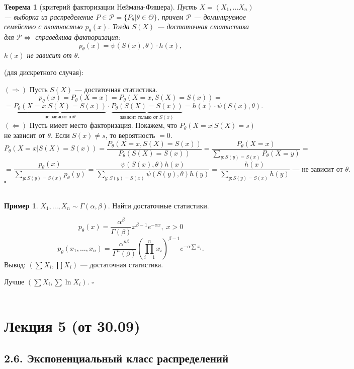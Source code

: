 \documentclass[12pt]{report}
\renewenvironment{proof}{{\bfseries Доказательство:}}{$\square$\\\\}
\newenvironment{solution}{{\bfseries Решение:}}{$\square$\\\\}
\newtheorem{theorem}{Теорема}
\theoremstyle{definition}
\newtheorem{example}{Пример}
\begin{document}
\begin{theorem}[критерий факторизации Неймана-Фишера]
	Пусть $X = (X_1, \ldots X_n)$ — выборка из распределение $P \in \mathcal{P} = \{P_\theta | \theta \in \Theta\}$, причем $\mathcal{P}$ — доминируемое семейство с плотностью $p_\theta(x)$. Тогда $S(X)$ — достаточная статистика для $\mathcal{P} \Leftrightarrow$ справедлива факторизация:
	$$p_\theta(x) = \psi(S(x), \theta) \cdot h(x),$$
	$h(x)$ не зависит от $\theta$.
\end{theorem}
\begin{proof}
	(для дискретного случая):

	$(\Rightarrow)$ Пусть $S(X)$ — достаточная статистика.
	$$p_\theta(x) = P_\theta(X = x) = P_\theta(X = x, S(X) = S(x)) = $$ 
	$$ = \underbrace{P_\theta(X = x | S(X) = S(x))}_{\text{не зависит от} \theta} \cdot \underbrace{P_\theta(S(X) = S(x))}_{\text{зависит только от }S(x)} = h(x) \cdot \psi(S(x), \theta).$$
	$(\Leftarrow)$ Пусть имеет место факторизация. Покажем, что $P_\theta(X = x | S(X) = s)$ не зависит от $\theta$. Если $S(x) \neq s$, то вероятность $ = 0$.
	$$P_\theta(X = x | S(X) = S(x)) = \dfrac{P_\theta(X = x, S(X) = S(x))}{P_\theta(S(X) = S(x))} = \dfrac{P_\theta(X = x)}{\displaystyle{\sum_{y: S(y) = S(x)}} P_\theta (X = y)} = $$ 
	$$ = \dfrac{p_\theta(x)}{\displaystyle{\sum_{y: S(y) = S(x)}} p_\theta(y)} = \dfrac{\psi(S(x), \theta)h(x)}{\displaystyle{\sum_{y: S(y) = S(x)}} \psi(S(y), \theta)h(y)} = \dfrac{h(x)}{\displaystyle{\sum_{y: S(y) = S(x)} h(y)}} \text{ — не зависит от } \theta.$$
\end{proof}
\begin{example}
	$X_1, \ldots, X_n \sim \Gamma(\alpha, \beta)$. Найти достаточные статистики.
\end{example}
\begin{solution}
	$$p_\theta(x) = \dfrac{\alpha^\beta}{\Gamma(\beta)} x^{\beta - 1} e^{-\alpha x}, \; x > 0$$
	$$p_\theta(x_1, \ldots, x_n) = \dfrac{\alpha^{n\beta}}{\Gamma^n(\beta)} \left(\prod_{i=1}^n x_i\right)^{\beta - 1} e^{-\alpha \sum x_i}.$$
	Вывод: $(\sum X_i, \prod X_i)$ — достаточная статистика.

	Лучше $(\sum X_i, \sum \ln X_i)$.
\end{solution}


\section{Лекция 5 (от 30.09)}
\subsection{2.6. Экспоненциальный класс распределений}
\end{document}
